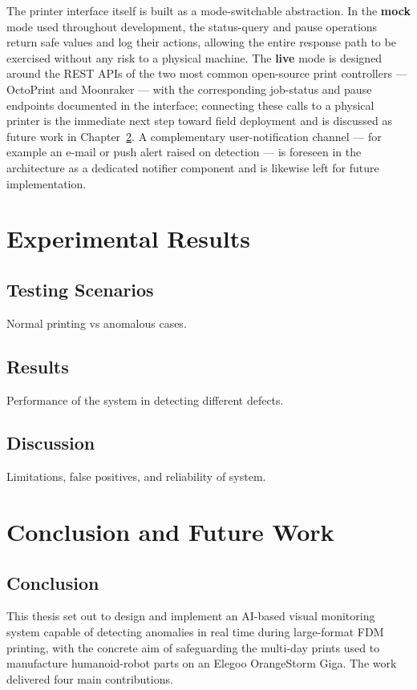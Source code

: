 \documentclass[english, Lau, oneside]{sapthesis}
\begin{document}
The printer interface itself is built as a mode-switchable abstraction. In the \textbf{mock} mode used throughout development, the status-query and pause operations return safe values and log their actions, allowing the entire response path to be exercised without any risk to a physical machine. The \textbf{live} mode is designed around the REST APIs of the two most common open-source print controllers --- OctoPrint and Moonraker --- with the corresponding job-status and pause endpoints documented in the interface; connecting these calls to a physical printer is the immediate next step toward field deployment and is discussed as future work in Chapter~\ref{chap:conclusion}. A complementary user-notification channel --- for example an e-mail or push alert raised on detection --- is foreseen in the architecture as a dedicated notifier component and is likewise left for future implementation.

\chapter{Experimental Results}
\label{chap:results}

\section{Testing Scenarios}
Normal printing vs anomalous cases.

\section{Results}
Performance of the system in detecting different defects.

\section{Discussion}
Limitations, false positives, and reliability of system.

\chapter{Conclusion and Future Work}
\label{chap:conclusion}

\section{Conclusion}
This thesis set out to design and implement an AI-based visual monitoring system capable of detecting anomalies in real time during large-format FDM printing, with the concrete aim of safeguarding the multi-day prints used to manufacture humanoid-robot parts on an Elegoo OrangeStorm Giga. The work delivered four main contributions.
\end{document}
